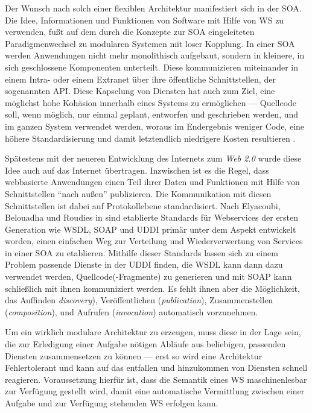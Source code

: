 \label{l:soa}Der Wunsch nach solch einer flexiblen Architektur manifestiert sich in der \ac{SOA}. Die Idee, Informationen und Funktionen von Software mit Hilfe von \acl{WS} zu verwenden, fußt auf dem durch die Konzepte zur \ac{SOA} eingeleiteten Paradigmenwechsel zu modularen Systemen mit loser Kopplung. In einer \ac{SOA} werden Anwendungen nicht mehr monolithisch aufgebaut, sondern in kleinere, in sich geschlossene Komponenten unterteilt. Diese kommunizieren miteinander in einem Intra- oder einem Extranet über ihre öffentliche Schnittstellen, der sogenannten \ac{API}. Diese Kapselung von Diensten hat auch zum Ziel, eine möglichst hohe Kohäsion innerhalb eines Systems zu ermöglichen --- Quellcode soll, wenn möglich, nur einmal geplant, entworfen und geschrieben werden, und im ganzen System verwendet werden, woraus im Endergebnis weniger Code, eine höhere Standardisierung und damit letztendlich niedrigere Kosten resultieren \cite{hn-web20}. 

Spätestens mit der neueren Entwicklung des Internets zum \emph{Web 2.0} wurde diese Idee auch auf das Internet übertragen. Inzwischen ist es die Regel, dass webbasierte Anwendungen einen Teil ihrer Daten und Funktionen mit Hilfe von Schnittstellen "`nach außen"' publizieren. Die Kommunikation mit diesen Schnittstellen ist dabei auf Protokollebene standardisiert. Nach Elyacoubi, Belouadha und Roudies in \cite{ei-sawsdl} sind etablierte Standards für Webservices der ersten Generation wie \ac{WSDL}, \ac{SOAP} und \ac{UDDI} primär unter dem Aspekt entwickelt worden, einen einfachen Weg zur Verteilung und Wiederverwertung von Services in einer \ac{SOA} zu etablieren. Mithilfe dieser Standards lassen sich zu einem Problem passende Dienste in der \ac{UDDI} finden, die \ac{WSDL} kann dann dazu verwendet werden, Quellcode(-Fragmente) zu generieren und mit \ac{SOAP} kann schließlich mit ihnen kommuniziert werden. Es fehlt ihnen aber die Möglichkeit, das Auffinden \emph{discovery}), Veröffentlichen (\emph{publication}), Zusammenstellen (\emph{composition}), und Aufrufen (\emph{invocation}) automatisch vorzunehmen. \cite[S.653]{ei-sawsdl}

\label{l:intro-loosecoupling}Um ein wirklich modulare Architektur zu erzeugen, muss diese in der Lage sein, die zur Erledigung einer Aufgabe nötigen Abläufe aus beliebigen, passenden Diensten zusammensetzen zu können --- erst so wird eine Architektur Fehlertolerant und kann auf das entfallen und hinzukommen von Diensten schnell reagieren. Voraussetzung hierfür ist, dass die Semantik eines \acl{WS} maschinenlesbar zur Verfügung gestellt wird, damit eine automatische Vermittlung zwischen einer Aufgabe und zur Verfügung stehenden \acl{WS} erfolgen kann.

